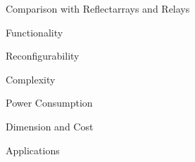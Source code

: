 \begin{section}{}
	\begin{subsection}{Comparison with Reflectarrays and Relays}
		\begin{subsubsection}{Functionality}

		\end{subsubsection}

		\begin{subsubsection}{Reconfigurability}

		\end{subsubsection}

		\begin{subsubsection}{Complexity}

		\end{subsubsection}

		\begin{subsubsection}{Power Consumption}

		\end{subsubsection}

		\begin{subsubsection}{Dimension and Cost}

		\end{subsubsection}

		\begin{subsubsection}{Applications}

		\end{subsubsection}
	\end{subsection}
\end{section}

